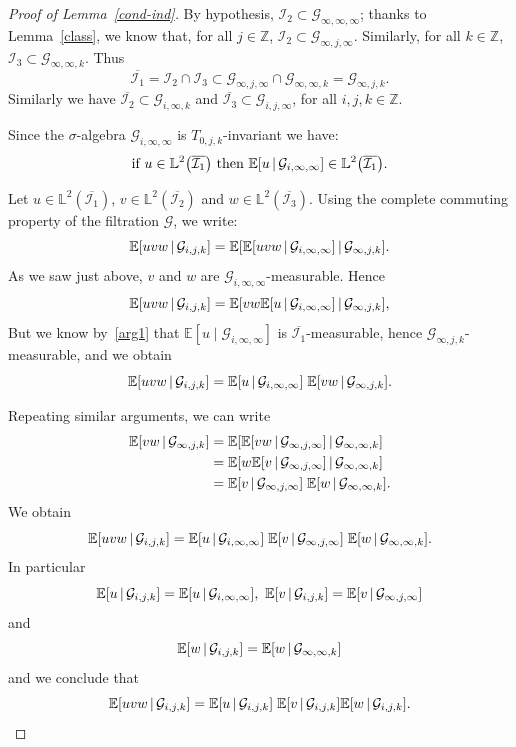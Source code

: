 \documentclass[10pt]{amsart}
\theoremstyle{definition}\newtheorem{defi}[theo]{Definition}\newtheorem{rema}[theo]{Remark}\newtheorem{exam}[theo]{Example}\newtheorem{exem}[theo]{Example}\newtheorem{nota}[theo]{Notation}
\newcommand{\Z}{\mathbb{Z}}
\newcommand*\bbL{\mathbb{L}}
\newcommand{\bbE}{\mathbb{E}}
\newcommand{\E}[1]{\bbE\left[#1\right]}
\newcommand*\I{\mathcal{I}}
\newcommand*\G{\mathcal{G}}
\let\originalleft\left
\let\originalright\right
\renewcommand{\left}{\mathopen{}\mathclose\bgroup\originalleft}
\renewcommand{\right}{\aftergroup\egroup\originalright}
\begin{document}
\begin{proof}[Proof of Lemma~\ref{cond-ind}]
By hypothesis, $\I_2\subset\G_{\infty,\infty,\infty}$; thanks to Lemma~\ref{class}, we know that, for all $j\in\Z$, $\I_2\subset\G_{\infty,j,\infty}$. Similarly, for all $k\in\Z$, $\I_3\subset\G_{\infty,\infty,k}$. Thus
\[
\overline{\I_1}=\I_2\cap\I_3\subset\G_{\infty,j,\infty}\cap\G_{\infty,\infty,k}=\G_{\infty,j,k}.
\]
Similarly we have $\overline{\I_2}\subset\G_{i,\infty,k}$ and $\overline{\I_3}\subset\G_{i,j,\infty}$, for all $i,j,k\in\Z$.

Since the $\sigma$-algebra $\G_{i,\infty,\infty}$ is $T_{0,j,k}$-invariant we have:
\begin{equation}\label{arg1}
\text{if }u\in \bbL^2\left(\overline{\I_1}\right) \text{ then } \E{u\,\middle|\,\G_{i,\infty,\infty}}\in \bbL^2\left(\overline{\I_1}\right).
\end{equation}

Let $u\in \bbL^2(\overline{\I_1})$, $v\in \bbL^2(\overline{\I_2})$ and $w\in \bbL^2(\overline{\I_3})$. Using the complete commuting property of the filtration $\G$, we write:
\[
\E{uvw\,\middle|\,\G_{i,j,k}}=\bbE\left[\E{uvw\,\middle|\,\G_{i,\infty,\infty}}\,\middle|\,\G_{\infty,j,k}\right].
\]
As we saw just above, $v$ and $w$ are $\G_{i,\infty,\infty}$-measurable. Hence
\[
\E{uvw\,\middle|\,\G_{i,j,k}}=\bbE\left[vw\E{u\,\middle|\,\G_{i,\infty,\infty}}\,\middle|\,\G_{\infty,j,k}\right],
\]
But we know by~\eqref{arg1} that $\bbE[u\mid\G_{i,\infty,\infty}]$ is $\overline{\I_1}$-measurable, hence $\G_{\infty,j,k}$-measurable, and we obtain
\begin{equation*}\label{arg2}
\E{uvw\,\middle|\,\G_{i,j,k}}=\E{u\,\middle|\,\G_{i,\infty,\infty}}\;\E{vw\,\middle|\,\G_{\infty,j,k}}.
\end{equation*}

Repeating similar arguments, we can write
\begin{align*}
\E{vw\,\middle|\,\G_{\infty,j,k}}
&=\bbE\left[\E{vw\,\middle|\,\G_{\infty,j,\infty}}\,\middle|\,\G_{\infty,\infty,k}\right]\\
&=\bbE\left[w\E{v\,\middle|\,\G_{\infty,j,\infty}}\,\middle|\,\G_{\infty,\infty,k}\right]\\
&=\E{v\,\middle|\,\G_{\infty,j,\infty}}\;\E{w\,\middle|\,\G_{\infty,\infty,k}}.
\end{align*}
We obtain
\[
\E{uvw\,\middle|\,\G_{i,j,k}}=\E{u\,\middle|\,\G_{i,\infty,\infty}}\;\E{v\,\middle|\,\G_{\infty,j,\infty}}\;\E{w\,\middle|\,\G_{\infty,\infty,k}}.
\]
In particular
\[
\E{u\,\middle|\,\G_{i,j,k}}=\E{u\,\middle|\,\G_{i,\infty,\infty}},\
\E{v\,\middle|\,\G_{i,j,k}}=\E{v\,\middle|\,\G_{\infty,j,\infty}}
\]
and
\[
\E{w\,\middle|\,\G_{i,j,k}}=\E{w\,\middle|\,\G_{\infty,\infty,k}}
\]
and we conclude that
\[
\E{uvw\,\middle|\,\G_{i,j,k}}=\E{u\,\middle|\,\G_{i,j,k}}\;\E{v\,\middle|\,\G_{i,j,k}}\E{w\,\middle|\,\G_{i,j,k}}.\qedhere
\]
\end{proof}
\end{document}
